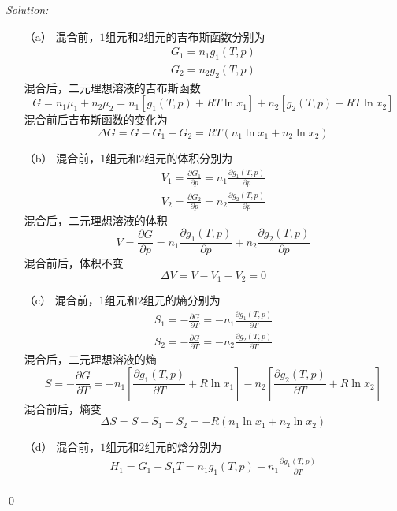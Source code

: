 \documentclass[12pt,a4paper]{article}
\newenvironment{sol}
    {\emph{Solution:}
    }
    {
    \qed
    }
\begin{document}
\begin{sol}
\begin{itemize}
\item[（a）] 混合前，$1$组元和$2$组元的吉布斯函数分别为
\begin{gather}
G_1=n_1g_1(T,p)\\
G_2=n_2g_2(T,p)
\end{gather}
混合后，二元理想溶液的吉布斯函数
\begin{equation}
G=n_1\mu_1+n_2\mu_2=n_1[g_1(T,p)+RT\ln x_1]+n_2[g_2(T,p)+RT\ln x_2]
\end{equation}
混合前后吉布斯函数的变化为
\begin{equation}
\Delta G=G-G_1-G_2=RT(n_1\ln x_1+n_2\ln x_2)
\end{equation}
\item[（b）] 混合前，$1$组元和$2$组元的体积分别为
\begin{gather}
V_1=\frac{\partial G_1}{\partial p}=n_1\frac{\partial g_1(T,p)}{\partial p}\\
V_2=\frac{\partial G_2}{\partial p}=n_2\frac{\partial g_2(T,p)}{\partial p}
\end{gather}
混合后，二元理想溶液的体积
\begin{equation}
V=\frac{\partial G}{\partial p}=n_1\frac{\partial g_1(T,p)}{\partial p}+n_2\frac{\partial g_2(T,p)}{\partial p}
\end{equation}
混合前后，体积不变
\begin{equation}
\Delta V=V-V_1-V_2=0
\end{equation}
\item[（c）] 混合前，$1$组元和$2$组元的熵分别为
\begin{gather}
S_1=-\frac{\partial G}{\partial T}=-n_1\frac{\partial g_1(T,p)}{\partial T}\\
S_2=-\frac{\partial G}{\partial T}=-n_2\frac{\partial g_2(T,p)}{\partial T}
\end{gather}
混合后，二元理想溶液的熵
\begin{equation}
S=-\frac{\partial G}{\partial T}=-n_1\left[\frac{\partial g_1(T,p)}{\partial T}+R\ln x_1\right]-n_2\left[\frac{\partial g_2(T,p)}{\partial T}+R\ln x_2\right]
\end{equation}
混合前后，熵变
\begin{equation}
\Delta S=S-S_1-S_2=-R(n_1\ln x_1+n_2\ln x_2)
\end{equation}
\item[（d）] 混合前，$1$组元和$2$组元的焓分别为
\begin{gather}
H_1=G_1+S_1T=n_1g_1(T,p)-n_1\frac{\partial g_1(T,p)}{\partial T}\\

\end{gather}
\end{itemize}
\end{sol}
\end{document}
